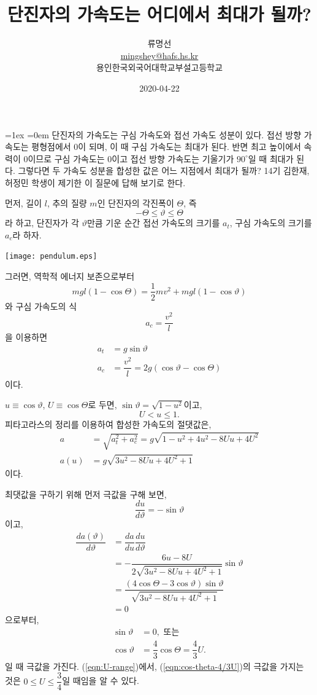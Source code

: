 \documentclass[a4paper, twocolumn]{article}
\title{단진자의 가속도는 어디에서 최대가 될까?}
\author{류명선\\\href{mailto:mingshey@hafs.hs.kr}{mingshey@hafs.hs.kr}\\{용인한국외국어대학교부설고등학교}}
\date{2020-04-22}
\date{}
\begin{document}
\textheight=260mm
\textwidth=180mm
\voffset=-25mm
\topmargin=0mm
\oddsidemargin=-10mm

\maketitle

\parskip=1ex
\parindent=0em
\baselineskip=14pt
단진자의 가속도는 구심 가속도와 접선 가속도 성분이 있다. 접선 방향 가속도는 평형점에서 0이 되며, 이 때 구심 가속도는 최대가 된다. 반면 최고 높이에서 속력이 0이므로 구심 가속도는 0이고 접선 방향 가속도는 기울기가 $ 90^\circ $일 때 최대가 된다.  그렇다면 두 가속도 성분을 합성한 값은 어느 지점에서 최대가 될까? 14기 김한재, 허정민 학생이 제기한 이 질문에 답해 보기로 한다.

먼저, 길이 $l$, 추의 질량 $m$인 단진자의 각진폭이 $\Theta$, 즉 $$ -\Theta\le\vartheta\le\Theta $$라 하고, 단진자가 각 $\vartheta$만큼 기운 순간 접선 가속도의 크기를 $a_t$, 구심 가속도의 크기를 $a_c$라 하자.\par
\hfill \texttt{[image: pendulum.eps]} \hfill\,

그러면, 역학적 에너지 보존으로부터 $$ mgl\left(1-\cos\Theta\right)=\dfrac{1}{2}m v^2 + mgl\left(1-\cos\vartheta\right) $$와 구심 가속도의 식 $$ a_c = \dfrac{v^2}{l} $$을 이용하면
\begin{align}
a_t &= g\sin\vartheta\label{eqn:at}\\
a_c &= \dfrac{v^2}{l}=2g\left(\cos\vartheta-\cos\Theta\right)\label{eqn:ac}
\end{align}
이다. 

$u\equiv\cos\vartheta$, $U\equiv\cos\Theta$로 두면, $\sin\vartheta=\sqrt{1-u^2}$이고, 
\begin{equation} U<u\le{}1.\label{eqn:U-range} \end{equation} 
피타고라스의 정리를 이용하여 합성한 가속도의 절댓값은,
\begin{align*}
a&=\sqrt{a_t^2 + a_c^2}=g\sqrt{1-u^2 + 4 u^2-8 U u+4 U^2}\\
a(u) &=g\sqrt{3 u^2-8 U u + 4U^2 +1}
\end{align*}
이다.

최댓값을 구하기 위해 먼저 극값을 구해 보면, $$  \dfrac{du}{d\vartheta} =-\sin\vartheta $$이고,
\begin{align}
\dfrac{da(\vartheta)}{d\vartheta}&=\dfrac{da}{du}\dfrac{du}{d\vartheta}\\
&=-\dfrac{6 u- 8U}{2\sqrt{3 u^2-8 U u + 4U^2 +1}}\sin\vartheta\nonumber \\
&=\dfrac{(4\cos\Theta-3\cos\vartheta)\sin\vartheta}{\sqrt{3 u^2-8 U u + 4U^2 +1}}\nonumber \\
&=0\nonumber
\end{align}
으로부터,
\begin{align}
\sin\vartheta&=0, \textrm{ 또는}\label{eqn:sin-theta-0}\\
\cos\vartheta &= \dfrac{4}{3}\cos\Theta=\dfrac{4}{3}U.\label{eqn:cos-theta-4/3U}
\end{align}
일 때 극값을 가진다. (\ref{eqn:U-range})에서, (\ref{eqn:cos-theta-4/3U})의 극값을 가지는 것은 $0\le{}U\le\dfrac{3}{4}$일 때임을 알 수 있다.\par
\end{document}
